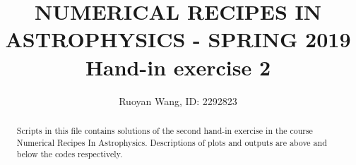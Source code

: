 \documentclass[a4paper,12pt]{article}
\title{NUMERICAL RECIPES IN ASTROPHYSICS - SPRING 2019 \\
	\vspace{5mm} \large Hand-in exercise 2 }
\author{Ruoyan Wang, ID: 2292823}
\begin{document}
\maketitle

\begin{abstract}
Scripts in this file contains solutions of the second hand-in exercise in the course Numerical Recipes In Astrophysics. Descriptions of plots and outputs are above and below the codes respectively. 
\end{abstract}

%
%
%
%
%

%

%
%
\end{document}
